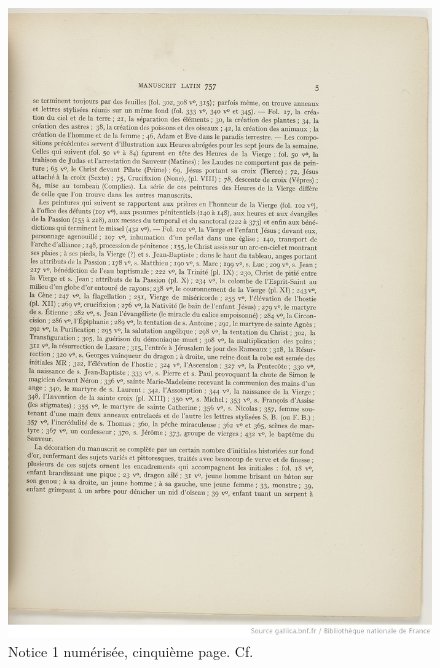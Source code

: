\documentclass[a4paper,12pt,twoside]{book}
\begin{document}
    \begin{figure}[!h]
    \centering
    \includegraphics[width=15cm]{img/Notices_Leroquais/Notice1/Papier/notice_papier_1_5.jpeg}
    \caption{Notice 1 numérisée, cinquième page. Cf. \cite[p. 5]{Leroquais_notices}}
    \end{figure}
    \clearpage
    
\end{document}
